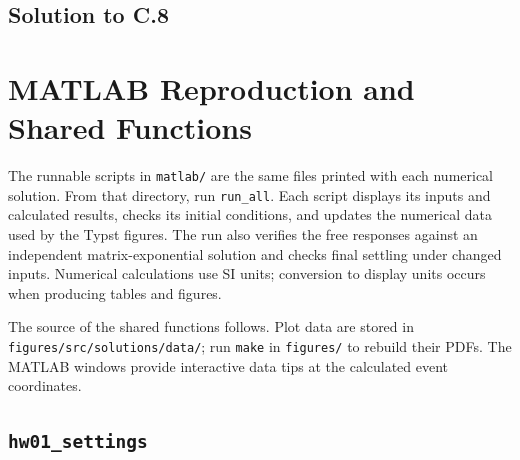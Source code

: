 \documentclass[11pt]{article}
\begin{document}
\taskprompt
{}
\clearpage
\subsection*{Solution to C.8}

\clearpage
\section{MATLAB Reproduction and Shared Functions}
The runnable scripts in \texttt{matlab/} are the same files printed with each numerical solution. From that directory, run \texttt{run\_all}. Each script displays its inputs and calculated results, checks its initial conditions, and updates the numerical data used by the Typst figures. The run also verifies the free responses against an independent matrix-exponential solution and checks final settling under changed inputs. Numerical calculations use SI units; conversion to display units occurs when producing tables and figures.

The source of the shared functions follows. Plot data are stored in \texttt{figures/src/solutions/data/}; run \texttt{make} in \texttt{figures/} to rebuild their PDFs. The MATLAB windows provide interactive data tips at the calculated event coordinates.
\subsection*{\texttt{hw01\_settings}}

\end{document}
